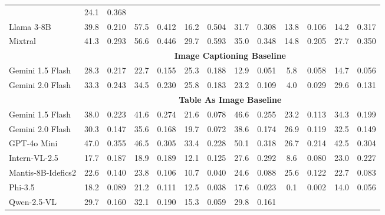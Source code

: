 \documentclass[11pt]{article}
\begin{document}
\begin{table}[h]
\begin{tabular}{lcc|cc|cc|cc|cc|cc}
 & 24.1   & \cellcolor{yellow}0.368 \\
Llama 3-8B 
 & 39.8   & 0.210 
 & 57.5   & 0.412 
 & 16.2   & 0.504 
 & 31.7   & 0.308 
 & 13.8   & 0.106 
 & 14.2   & 0.317 \\
Mixtral 
 & 41.3   & \cellcolor{yellow}0.293 
 & 56.6   & 0.446 
 & \cellcolor{yellow}29.7 & 0.593 
 & 35.0   & \cellcolor{yellow}0.348 
 & \cellcolor{yellow}14.8 & 0.205 
 & 27.7   & 0.350 \\
\cmidrule{2-13}
& \multicolumn{12}{c}{\textbf{Image Captioning Baseline}} \\
\cmidrule{2-13}
Gemini 1.5 Flash 
 & 28.3   & 0.217 
 & 22.7   & 0.155 
 & 25.3   & \cellcolor{yellow}0.188 
 & 12.9   & 0.051 
 & \cellcolor{yellow}5.8 & 0.058 
 & 14.7   & 0.056 \\
Gemini 2.0 Flash 
 & \cellcolor{yellow}33.3 & \cellcolor{yellow}0.243 
 & \cellcolor{yellow}34.5 & \cellcolor{yellow}0.230 
 & \cellcolor{yellow}25.8 & 0.183 
 & \cellcolor{yellow}23.2 & \cellcolor{yellow}0.109 
 & 4.0    & \cellcolor{yellow}0.029 
 & \cellcolor{yellow}29.6 & \cellcolor{yellow}0.131 \\
\cmidrule{2-13}
& \multicolumn{12}{c}{\textbf{Table As Image Baseline}} \\
\cmidrule{2-13}
Gemini 1.5 Flash 
 & 38.0   & 0.223 
 & 41.6   & 0.274 
 & 21.6   & 0.078 
 & 46.6   & 0.255 
 & 23.2   & 0.113 
 & 34.3   & 0.199 \\
Gemini 2.0 Flash 
 & 30.3   & 0.147 
 & 35.6   & 0.168 
 & 19.7   & 0.072 
 & 38.6   & 0.174 
 & \cellcolor{yellow}26.9 & 0.119 
 & 32.5   & 0.149 \\
GPT-4o Mini 
 & \cellcolor{yellow}47.0 & \cellcolor{yellow}0.355 
 & \cellcolor{yellow}46.5 & \cellcolor{yellow}0.305 
 & \cellcolor{yellow}33.4 & \cellcolor{yellow}0.228 
 & \cellcolor{yellow}50.1 & \cellcolor{yellow}0.318 
 & 26.7   & \cellcolor{yellow}0.214 
 & \cellcolor{yellow}42.5 & \cellcolor{yellow}0.304 \\
Intern-VL-2.5 
 & 17.7   & 0.187 
 & 18.9   & 0.189 
 & 12.1   & 0.125 
 & 27.6   & 0.292 
 & 8.6    & 0.080 
 & 23.0   & 0.227 \\
Mantis-8B-Idefics2 
 & 22.6   & 0.140 
 & 23.8   & 0.106 
 & 10.7   & 0.040 
 & 24.6   & 0.088 
 & 25.6   & 0.122 
 & 22.7   & 0.083 \\
Phi-3.5 
 & 18.2   & 0.089 
 & 21.2   & 0.111 
 & 12.5   & 0.038 
 & 17.6   & 0.023 
 & 0.1    & 0.002 
 & 14.0   & 0.056 \\
Qwen-2.5-VL 
 & 29.7   & 0.160 
 & 32.1   & 0.190 
 & 15.3   & 0.059 
 & 29.8   & 0.161 

\end{tabular}
\end{table}
\end{document}
